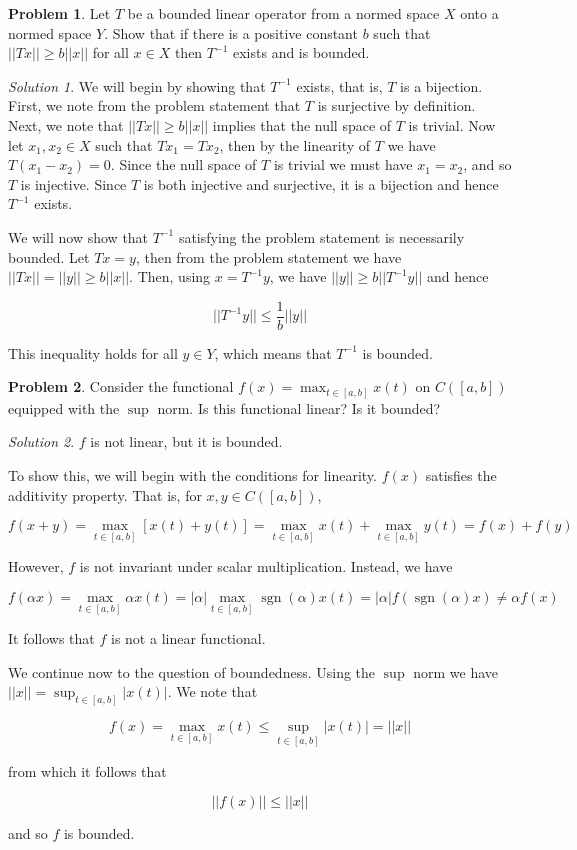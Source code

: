 \documentclass[12pt,a4paper]{article}
\theoremstyle{definition}
\newtheorem{problem}{Problem}
\theoremstyle{remark}
\newtheorem*{solution}{Solution}
\begin{document}
\begin{problem}
    Let $T$ be a bounded linear operator from a normed space $X$ onto a normed space $Y$. Show that if there is a positive constant $b$ such that $||Tx|| \ge b||x||$ for all $x\in X$ then $T^{-1}$ exists and is bounded.
\end{problem}
\begin{solution}
    We will begin by showing that $T^{-1}$ exists, that is, $T$ is a bijection. First, we note from the problem statement that $T$ is surjective by definition. Next, we note that $||Tx|| \ge b||x||$ implies that the null space of $T$ is trivial. Now let $x_1, x_2 \in X$ such that $Tx_1=Tx_2$, then by the linearity of $T$ we have $T(x_1-x_2) = 0$. Since the null space of $T$ is trivial we must have $x_1 = x_2$, and so $T$ is injective. Since $T$ is both injective and surjective, it is a bijection and hence $T^{-1}$ exists. 

    We will now show that $T^{-1}$ satisfying the problem statement is necessarily bounded. Let $Tx = y$, then from the problem statement we have $||Tx||= ||y|| \ge b||x||$. Then, using $x=T^{-1}y$, we have $||y|| \ge b||T^{-1} y||$ and hence 

    $$||T^{-1}y|| \le \frac{1}{b} ||y||$$

    This inequality holds for all $y \in Y$, which means that $T^{-1}$ is bounded. 
\end{solution}

\begin{problem}
    Consider the functional $f(x) = \max_{t \in [a,b]} x(t)$ on $C([a,b])$ equipped with the $\sup$ norm. Is this functional linear? Is it bounded?
\end{problem}
\begin{solution}
    $f$ is not linear, but it is bounded. 

    To show this, we will begin with the conditions for linearity. $f(x)$ satisfies the additivity property. That is, for $x, y \in C([a,b])$, 

    $$f(x+y) = \max_{t  \in [a,b]} [ x(t) + y(t)] = \max_{t \in [a,b]} x(t) + \max_{t\in[a,b]}y(t) = f(x)+ f(y)$$

    However, $f$ is not invariant under scalar multiplication. Instead, we have 

    $$f(\alpha x) = \max_{t \in [a,b]} \alpha x(t) = |\alpha| \max_{t\in[a,b]} \operatorname{sgn}(\alpha) x(t) = |\alpha| f(\operatorname{sgn}(\alpha)x) \ne \alpha f(x)$$

    It follows that $f$ is not a linear functional. 

    We continue now to the question of boundedness. Using the $\sup$ norm we have $||x|| = \sup_{t\in[a,b]}|x(t)|$. We note that 

    $$f(x) = \max_{t\in[a,b]}x(t) \le \sup_{t\in[a,b]}|x(t)| = ||x||$$

    from which it follows that 

    $$||f(x)|| \le ||x||$$

    and so $f$ is bounded.
\end{solution}
\end{document}
